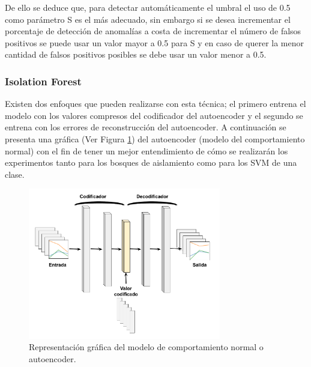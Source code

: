 \vspace{5mm} %

De ello se deduce que, para detectar autom\'{a}ticamente el umbral el uso de 0.5 como par\'{a}metro S es el m\'{a}s adecuado, sin embargo si se desea incrementar el porcentaje de detecci\'{o}n de anomal\'{i}as a costa de incrementar el n\'{u}mero de falsos positivos se puede usar un valor mayor a 0.5 para S y en caso de querer la menor cantidad de falsos positivos posibles se debe usar un valor menor a 0.5.

\vspace{5mm} %

\subsubsection{Isolation Forest}

Existen dos enfoques que pueden realizarse con esta t\'{e}cnica; el primero entrena el modelo con los valores compresos del codificador del autoencoder y el segundo se entrena con los errores de reconstrucci\'{o}n del autoencoder. A continuaci\'{o}n se presenta una gr\'{a}fica (Ver Figura \ref{fig:autoencoder}) del autoencoder (modelo del comportamiento normal) con el fin de tener un mejor entendimiento de c\'{o}mo se realizar\'{a}n los experimentos tanto para los bosques de aislamiento como para los SVM de una clase.

\begin{figure}[H]
        \centering
            \includegraphics[width=0.75\textwidth, frame]{imagenes/Cap5/autoencoder}
        \caption{Representaci\'{o}n gr\'{a}fica del modelo de comportamiento normal o autoencoder.}
		\label{fig:autoencoder}
\end{figure}

